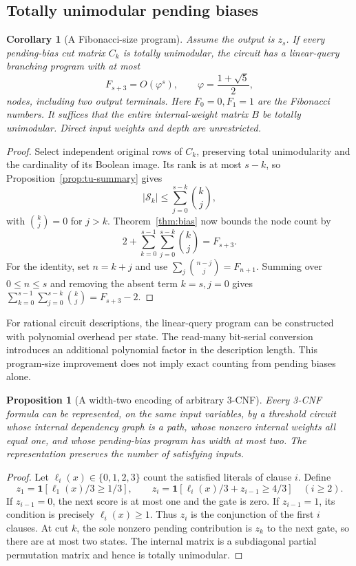 \documentclass[11pt]{article}
\newtheorem{corollary}[theorem]{Corollary}
\newtheorem{proposition}[theorem]{Proposition}
\theoremstyle{definition}
\newcommand{\ind}[1]{\mathbf 1[#1]}
\begin{document}
\subsection{Totally unimodular pending biases}
\label{sec:tu-pending}

\begin{corollary}[A Fibonacci-size program]\label{cor:fibonacci-bp}
Assume the output is \(z_s\). If every pending-bias cut matrix \(C_k\) is
totally unimodular, the circuit has a linear-query branching program with
at most
\[
 F_{s+3}=O(\varphi^s),\qquad
 \varphi=\frac{1+\sqrt5}{2},
\]
nodes, including two output terminals. Here \(F_0=0,F_1=1\) are the
Fibonacci numbers. It suffices that the entire internal-weight matrix
\(B\) be totally unimodular. Direct input weights and depth are unrestricted.
\end{corollary}

\begin{proof}
Select independent original rows of \(C_k\), preserving total
unimodularity and the cardinality of its Boolean image. Its rank is at
most \(s-k\), so Proposition~\ref{prop:tu-summary} gives
\[
 |\mathcal S_k|\le\sum_{j=0}^{s-k}\binom kj,
\]
with \(\binom kj=0\) for \(j>k\). Theorem~\ref{thm:bias} now bounds the
node count by
\[
 2+\sum_{k=0}^{s-1}\sum_{j=0}^{s-k}\binom kj=F_{s+3}.    \tag{P1}
\]
For the identity, set \(n=k+j\) and use
\(\sum_j\binom{n-j}{j}=F_{n+1}\). Summing over \(0\le n\le s\) and
removing the absent term \(k=s,j=0\) gives
\(\sum_{k=0}^{s-1}\sum_{j=0}^{s-k}\binom kj=F_{s+3}-2\).
\end{proof}

For rational circuit descriptions, the linear-query program can be
constructed with polynomial overhead per state. The read-many bit-serial
conversion introduces an additional polynomial factor in the description
length. This program-size improvement does not imply exact counting from
pending biases alone.

\begin{proposition}[A width-two encoding of arbitrary 3-CNF]
\label{prop:width-two-cnf}
Every 3-CNF formula can be represented, on the same input variables, by a
threshold circuit whose internal dependency graph is a path, whose nonzero
internal weights all equal one, and whose pending-bias program has width
at most two. The representation preserves the number of satisfying inputs.
\end{proposition}

\begin{proof}
Let \(\ell_i(x)\in\{0,1,2,3\}\) count the satisfied literals of clause
\(i\). Define
\[
 z_1=\ind{\ell_1(x)/3\ge1/3},\qquad
 z_i=\ind{\ell_i(x)/3+z_{i-1}\ge4/3}\quad(i\ge2).
\]
If \(z_{i-1}=0\), the next score is at most one and the gate is zero.
If \(z_{i-1}=1\), its condition is precisely \(\ell_i(x)\ge1\).
Thus \(z_i\) is the conjunction of the first \(i\) clauses. At cut \(k\),
the sole nonzero pending contribution is \(z_k\) to the next gate, so
there are at most two states. The internal matrix is a subdiagonal
partial permutation matrix and hence is totally unimodular.
\end{proof}
\end{document}
